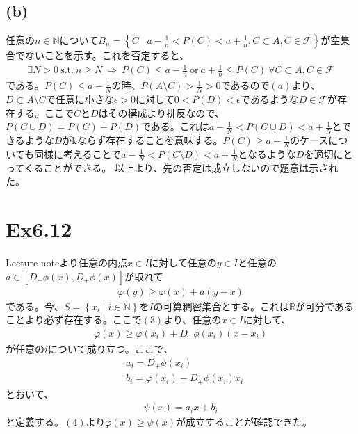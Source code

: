 \documentclass{article}
\begin{document}
\subsection{(b)}
任意の$n \in \mathbb{N}$について$B_n = \left\{ C \mid a - \frac{1}{n} < P(C) < a + \frac{1}{n}, C \subset A, C \in \mathcal{F}\right\}$が空集合でないことを示す。これを否定すると、
\begin{align*}
	\exists N > 0\ \text{s.t.}\ n \geq N\ \Rightarrow\ P(C) \leq a - \frac{1}{n}\ \text{or}\ a + \frac{1}{n} \leq P(C)\ \forall C \subset A, C \in \mathcal{F}
\end{align*}
である。$P(C) \leq a - \frac{1}{N}$の時、$P(A \setminus C) > \frac{1}{N} > 0$であるので$(a)$より、$D \subset A \setminus C$で任意に小さな$\epsilon > 0$に対して$0 < P(D) < \epsilon$であるような$D \in \mathcal{F}$が存在する。ここで$C$と$D$はその構成より排反なので、$P(C \cup D) = P(C) + P(D)$である。これは$a - \frac{1}{N} < P(C\cup D) < a + \frac{1}{N}$とできるような$D$がkならず存在することを意味する。$P(C) \geq a + \frac{1}{N}$のケースについても同様に考えることで$a - \frac{1}{N} < P(C\setminus D) < a + \frac{1}{N}$となるような$D$を適切にとってくることができる。
以上より、先の否定は成立しないので題意は示された。

\section{Ex6.12}
Lecture noteより任意の内点$x \in I$に対して任意の$y \in I$と任意の$a \in \left[ D_{-}\phi(x), D_{+}\phi(x) \right]$が取れて
\begin{align}
	\varphi(y) \geq \varphi(x) + a(y-x)
\end{align}
である。今、$S = \left\{ x_i \mid i \in \mathbb{N} \right\}$を$I$の可算稠密集合とする。これは$\mathbb{R}$が可分であることより必ず存在する。ここで$(3)$より、任意の$x\in I$に対して、
\begin{align}
	\varphi(x) \geq \varphi(x_i) + D_{+}\phi(x_i) (x - x_i)
\end{align}
が任意の$i$について成り立つ。ここで、
\begin{align*}
	&a_i = D_{+}\phi(x_i)\\
	&b_i = \varphi(x_i) - D_{+}\phi(x_i) x_i
\end{align*}
とおいて、
\begin{align*}
	\psi(x) = a_i x + b_i
\end{align*}
と定義する。$(4)$より$\varphi(x) \geq \psi(x)$が成立することが確認できた。
\end{document}

